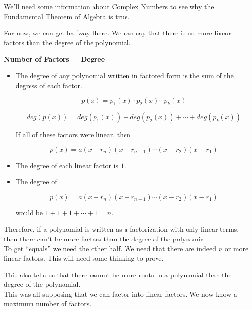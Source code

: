 \documentclass{ximera}
\begin{document}
We'll need some information about Complex Numbers to see why the Fundamental Theorem of Algebra is true.

For now, we can get halfway there. We can say that there is no more linear factors than the degree of the polynomial.



\begin{idea} \textbf{\textcolor{blue!55!black}{Number of Factors = Degree}}  \\


\begin{itemize}
\item The degree of any polynomial written in factored form is the sum of the degress of each factor.

\[
 p(x) = p_1(x) \cdot p_2(x) \cdots p_k(x)
\]

\[
deg(p(x)) = deg(p_1(x)) + deg(p_2(x)) + \cdots + deg(p_k(x))
\]

If all of these factors were linear, then 

\[
 p(x) = a (x - r_n) (x - r_{n-1}) \cdots (x - r_2)  (x - r_1) 
\]

\item The degree of each linear factor is $1$. \\

\item The degree of 

\[
p(x) = a (x - r_n) (x - r_{n-1}) \cdots (x - r_2)  (x - r_1) 
\]

would be $1 + 1 + 1 + \cdots + 1 = n$.
\end{itemize}



Therefore, if a polynomial is written as a factorization with only linear terms, then there can't be more factors than the degree of the polynomial. \\



To get ``equals'' we need the other half.  We need that there are indeed $n$ or more linear factors.  This will need some thinking to prove.

\end{idea}

This also tells us that there cannot be more roots to a polynomial than the degree of the polynomial. \\


This was all supposing that we can factor into linear factors.  We now know a maximum number of factors. \\
\end{document}
